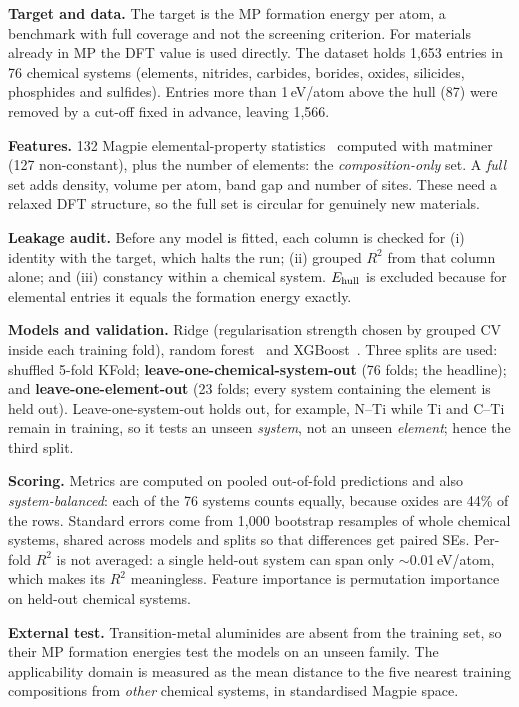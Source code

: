 \noindent\textbf{Target and data.} The target is the MP formation energy per atom, a benchmark with full coverage and not the screening criterion. For materials already in MP the DFT value is used directly. The dataset holds 1,653 entries in 76 chemical systems (elements, nitrides, carbides, borides, oxides, silicides, phosphides and sulfides). Entries more than 1\,eV/atom above the hull (87) were removed by a cut-off fixed in advance, leaving 1,566.

\noindent\textbf{Features.} 132 Magpie elemental-property statistics~\citep{Ward2016} computed with matminer~\citep{Ward2018} (127 non-constant), plus the number of elements: the \emph{composition-only} set. A \emph{full} set adds density, volume per atom, band gap and number of sites. These need a relaxed DFT structure, so the full set is circular for genuinely new materials.

\noindent\textbf{Leakage audit.} Before any model is fitted, each column is checked for (i) identity with the target, which halts the run; (ii) grouped $R^2$ from that column alone; and (iii) constancy within a chemical system. $E_{\mathrm{hull}}$ is excluded because for elemental entries it equals the formation energy exactly.

\noindent\textbf{Models and validation.} Ridge (regularisation strength chosen by grouped CV inside each training fold), random forest~\citep{Pedregosa2011} and XGBoost~\citep{Chen2016}. Three splits are used: shuffled 5-fold KFold; \textbf{leave-one-chemical-system-out} (76 folds; the headline); and \textbf{leave-one-element-out} (23 folds; every system containing the element is held out). Leave-one-system-out holds out, for example, N--Ti while Ti and C--Ti remain in training, so it tests an unseen \emph{system}, not an unseen \emph{element}; hence the third split.

\noindent\textbf{Scoring.} Metrics are computed on pooled out-of-fold predictions and also \emph{system-balanced}: each of the 76 systems counts equally, because oxides are 44\% of the rows. Standard errors come from 1,000 bootstrap resamples of whole chemical systems, shared across models and splits so that differences get paired SEs. Per-fold $R^2$ is not averaged: a single held-out system can span only $\sim$0.01\,eV/atom, which makes its $R^2$ meaningless. Feature importance is permutation importance on held-out chemical systems.

\noindent\textbf{External test.} Transition-metal aluminides are absent from the training set, so their MP formation energies test the models on an unseen family. The applicability domain is measured as the mean distance to the five nearest training compositions from \emph{other} chemical systems, in standardised Magpie space.

